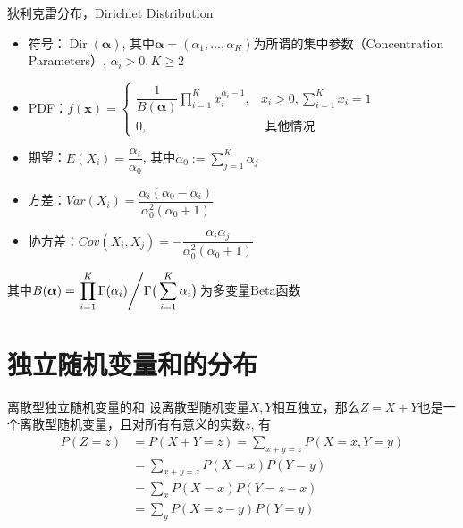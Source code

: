 
\begin{frame}

\begin{block}{狄利克雷分布，Dirichlet Distribution}
\begin{itemize}
\item 符号：$\operatorname{Dir}(\boldsymbol\alpha)$, \; 其中$\boldsymbol\alpha = (\alpha_1,\ldots,\alpha_K)$为所谓的集中参数（Concentration Parameters）, $\alpha_i>0, K \ge 2$
\item PDF：$\displaystyle
f(\mathbf{x}) = \begin{cases}
\dfrac{1}{B(\boldsymbol\alpha)} \prod\limits_{i=1}^{K} x_{i}^{\alpha_{i}-1}, & x_i > 0, \sum\limits_{i=1}^{K} x_i = 1 \\
0, & \text{ 其他情况}
\end{cases}$
\item 期望：$E(X_i) = \dfrac{\alpha_{i}}{\alpha_0}$, 其中$\alpha_0 := \sum\limits_{j=1}^K \alpha_{j}$
\item 方差：$Var(X_i) = \dfrac{\alpha_{i}(\alpha_{0}-\alpha_{i})}{\alpha_{0}^{2}(\alpha_{0}+1)}$
\item 协方差：$Cov(X_i,X_j) = -\dfrac{\alpha_{i}\alpha_{j}}{\alpha_{0}^{2}(\alpha_{0}+1)}$
\end{itemize}

其中$\displaystyle B({\boldsymbol {\alpha}}) = \left. \prod\limits_{i=1}^{K}\Gamma(\alpha_{i}) \middle/ \Gamma {\bigl(}\sum\limits_{i=1}^{K}\alpha_{i}{\bigr)} \right.$为多变量Beta函数
\end{block}

\end{frame}


\section{独立随机变量和的分布}


\begin{frame}

\begin{block}{离散型独立随机变量的和}
设离散型随机变量$X,Y$相互独立，那么$Z = X+Y$也是一个离散型随机变量，且对所有有意义的实数$z$, 有
\begin{align*}
P(Z=z) & = P(X+Y=z) = \sum\limits_{x+y=z} P(X=x,Y=y) \\
& = \sum\limits_{x+y=z} P(X=x)P(Y=y) \\
& = \sum\limits_x P(X=x)P(Y=z-x) \\
& = \sum\limits_y P(X=z-y)P(Y=y)
\end{align*}
\end{block}

\end{frame}

